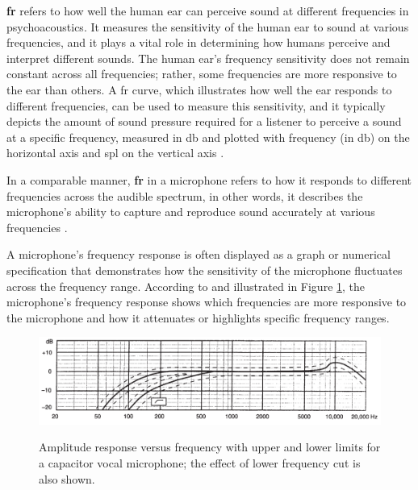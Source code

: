 \textbf{\gls{fr}} refers to how well the human ear can perceive sound at different frequencies in psychoacoustics. It measures the sensitivity of the human ear to sound at various frequencies, and it plays a vital role in determining how humans perceive and interpret different sounds. The human ear's frequency sensitivity does not remain constant across all frequencies; rather, some frequencies are more responsive to the ear than others. A \gls{fr} curve, which illustrates how well the ear responds to different frequencies, can be used to measure this sensitivity, and it typically depicts the amount of sound pressure required for a listener to perceive a sound at a specific frequency, measured in \gls{db} and plotted with frequency (in \gls{db}) on the horizontal axis and \gls{spl} on the vertical axis \cite{Moore2013}.

In a comparable manner, \textbf{\gls{fr}} in a microphone refers to how it responds to different frequencies across the audible spectrum, in other words, it describes the microphone's ability to capture and reproduce sound accurately at various frequencies \cite{Rayburn2004}.

A microphone's frequency response is often displayed as a graph or numerical specification that demonstrates how the sensitivity of the microphone fluctuates across the frequency range. According to \textcite{Rayburn2004} and illustrated in Figure \ref{fig:frmwk_microphone_frequency_response}, the microphone's frequency response shows which frequencies are more responsive to the microphone and how it attenuates or highlights specific frequency ranges.

\begin{figure}[htbp]
    \raggedright
        \caption{Amplitude response versus frequency with upper and lower limits for a capacitor vocal microphone; the effect of lower frequency cut is also shown.}
        \includegraphics[width=1\textwidth]{resources/images/030-theoretical_framework/Framework_microphone_frequency_response.png}
        \label{fig:frmwk_microphone_frequency_response}
\end{figure}

